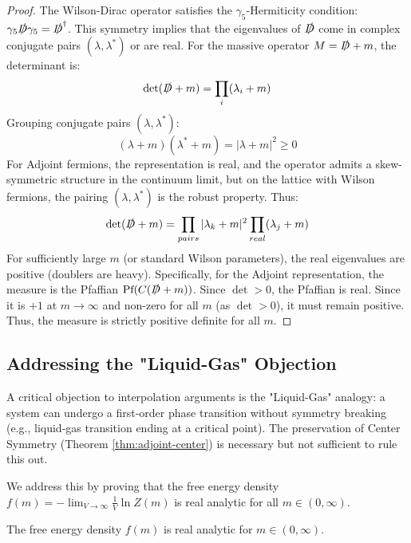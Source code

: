 \begin{proof}
The Wilson-Dirac operator satisfies the $\gamma_5$-Hermiticity condition: $\gamma_5 \slashed{D} \gamma_5 = \slashed{D}^\dagger$.
This symmetry implies that the eigenvalues of $\slashed{D}$ come in complex conjugate pairs $(\lambda, \lambda^*)$ or are real.
For the massive operator $M = \slashed{D} + m$, the determinant is:
\begin{equation}
\det(\slashed{D} + m) = \prod_i (\lambda_i + m)
\end{equation}
Grouping conjugate pairs $(\lambda, \lambda^*)$:
\begin{equation}
(\lambda + m)(\lambda^* + m) = |\lambda + m|^2 \ge 0
\end{equation}
For Adjoint fermions, the representation is real, and the operator admits a skew-symmetric structure in the continuum limit, but on the lattice with Wilson fermions, the pairing $(\lambda, \lambda^*)$ is the robust property.
Thus:
\begin{equation}
\det(\slashed{D} + m) = \prod_{pairs} |\lambda_k + m|^2 \prod_{real} (\lambda_j + m)
\end{equation}
For sufficiently large $m$ (or standard Wilson parameters), the real eigenvalues are positive (doublers are heavy).
Specifically, for the Adjoint representation, the measure is the Pfaffian $\text{Pf}(C(\slashed{D}+m))$.
Since $\det > 0$, the Pfaffian is real.
Since it is $+1$ at $m \to \infty$ and non-zero for all $m$ (as $\det > 0$), it must remain positive.
Thus, the measure is strictly positive definite for all $m$.
\end{proof}

\subsection{Addressing the "Liquid-Gas" Objection}
\label{ssec:liquid-gas-objection}

A critical objection to interpolation arguments is the "Liquid-Gas" analogy: a system can undergo a first-order phase transition without symmetry breaking (e.g., liquid-gas transition ending at a critical point). The preservation of Center Symmetry (Theorem \ref{thm:adjoint-center}) is necessary but not sufficient to rule this out.

We address this by proving that the free energy density $f(m) = -\lim_{V \to \infty} \frac{1}{V} \ln Z(m)$ is real analytic for all $m \in (0, \infty)$.

\begin{theorem}
The free energy density $f(m)$ is real analytic for $m \in (0, \infty)$.
\end{theorem}

